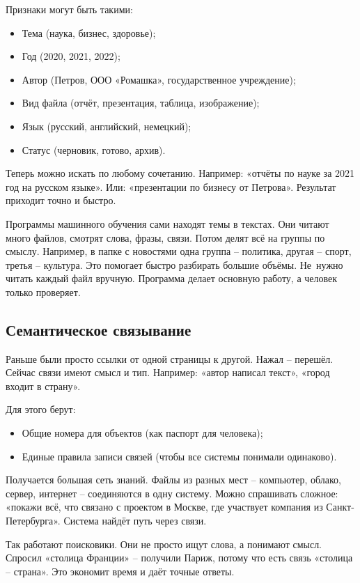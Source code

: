 \documentclass{ou}
\begin{document}
Признаки могут быть такими:
\begin{itemize}[label=-, leftmargin=0em, itemindent=3.35em, nosep]
\item Тема (наука, бизнес, здоровье);
\item Год (2020, 2021, 2022);
\item Автор (Петров, ООО «Ромашка», государственное учреждение);
\item Вид файла (отчёт, презентация, таблица, изображение);
\item Язык (русский, английский, немецкий);
\item Статус (черновик, готово, архив).
\end{itemize}

Теперь можно искать по любому сочетанию. Например: «отчёты по науке за 2021 год на русском языке». Или: «презентации по бизнесу от Петрова». Результат приходит точно и быстро.

Программы машинного обучения сами находят темы в текстах. Они читают много файлов, смотрят слова, фразы, связи. Потом делят всё на группы по смыслу. Например, в папке с новостями одна группа -- политика, другая -- спорт, третья -- культура. Это помогает быстро разбирать большие объёмы. Не~нужно читать каждый файл вручную. Программа делает основную работу, а человек только проверяет.
\subsection{Семантическое связывание}
Раньше были просто ссылки от одной страницы к другой. Нажал -- перешёл. Сейчас связи имеют смысл и тип. Например: «автор написал текст», «город входит в страну».

Для этого берут:
\begin{itemize}[label=-, leftmargin=0em, itemindent=3.35em, nosep]
\item Общие номера для объектов (как паспорт для человека);
\item Единые правила записи связей (чтобы все системы понимали одинаково).
\end{itemize}

Получается большая сеть знаний. Файлы из разных мест -- компьютер, облако, сервер, интернет -- соединяются в одну систему. Можно спрашивать сложное: «покажи всё, что связано с проектом в Москве, где участвует компания из Санкт-Петербурга». Система найдёт путь через связи.

Так работают поисковики. Они не просто ищут слова, а понимают смысл. Спросил «столица Франции» -- получили Париж, потому что есть связь «столица -- страна». Это экономит время и даёт точные ответы.
\end{document}
